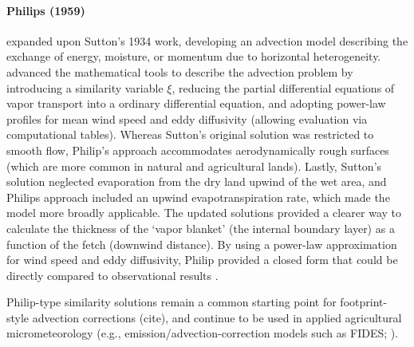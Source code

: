 \documentclass{article}
\begin{document}
    \paragraph{Philips (1959)} 
    \citet{philip1959theory} expanded upon Sutton's 1934 work, developing an advection model describing the exchange of energy, moisture, or momentum due to horizontal heterogeneity.
    \citet{philip1959theory} advanced the mathematical tools to describe the advection problem by introducing a similarity variable  $\xi$, reducing the partial differential equations of vapor transport into a ordinary differential equation, and adopting power-law profiles for mean wind speed and eddy diffusivity (allowing evaluation via computational tables). 
    Whereas Sutton’s original solution was restricted to smooth flow, Philip’s approach accommodates aerodynamically rough    surfaces (which are more common in natural and agricultural lands). 
    Lastly, Sutton’s solution neglected evaporation from the dry land upwind of the wet area, and Philips approach  included an upwind evapotranspiration rate, which made the model more broadly applicable.
     The updated solutions provided a clearer way to calculate the thickness of the `vapor blanket' (the internal boundary layer) as a function of the fetch (downwind distance). By using a power-law approximation for wind speed and eddy diffusivity, Philip provided a closed form that could be directly compared to observational results \cite{brutsaert2013evaporation}.

    Philip-type similarity solutions remain a common starting point for footprint-style advection corrections (cite), and continue to be used in applied agricultural micrometeorology (e.g., emission/advection-correction models such as FIDES; \cite{loubet2018fides}).
\end{document}
